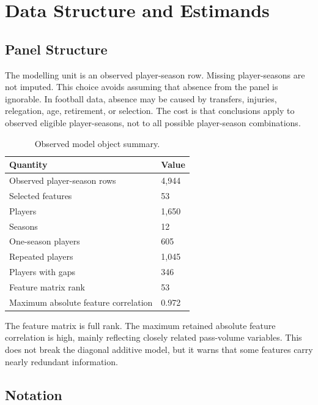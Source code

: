 \documentclass[11pt]{article}
\begin{document}
\section{Data Structure and Estimands}

\subsection{Panel Structure}

The modelling unit is an observed player-season row. Missing player-seasons are
not imputed. This choice avoids assuming that absence from the panel is
ignorable. In football data, absence may be caused by transfers, injuries,
relegation, age, retirement, or selection. The cost is that conclusions apply
to observed eligible player-seasons, not to all possible player-season
combinations.

\begin{table}[htbp]
\centering
\small
\caption{Observed model object summary.}
\label{tab:model-object}
\begin{tabular}{L{0.58\textwidth}R{0.22\textwidth}}
\toprule
Quantity & Value \\
\midrule
Observed player-season rows & 4,944 \\
Selected features & 53 \\
Players & 1,650 \\
Seasons & 12 \\
One-season players & 605 \\
Repeated players & 1,045 \\
Players with gaps & 346 \\
Feature matrix rank & 53 \\
Maximum absolute feature correlation & 0.972 \\
\bottomrule
\end{tabular}
\end{table}

The feature matrix is full rank. The maximum retained absolute feature
correlation is high, mainly reflecting closely related pass-volume variables.
This does not break the diagonal additive model, but it warns that some
features carry nearly redundant information.

\subsection{Notation}
\end{document}
